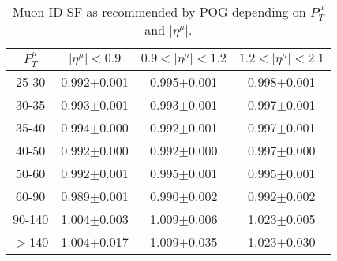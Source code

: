 \begin{table}[h]
  \footnotesize
  \begin{center}
  \caption{Muon ID SF as recommended by POG depending on $P_T^{\mu}$ and $|\eta^{\mu}|$.} 
   \begin{tabular}{|c|c|c|c|}
\hline
 $P_T^{\mu}$  & $|\eta^{\mu}|< 0.9$   & $0.9<|\eta^{\mu}|< 1.2$    & $1.2<|\eta^{\mu}|< 2.1$ \\ \hline
25-30          & 0.992$\pm$0.001   & 0.995$\pm$0.001    & 0.998$\pm$0.001     \\ \hline
30-35          & 0.993$\pm$0.001   & 0.993$\pm$0.001    & 0.997$\pm$0.001        \\ \hline
35-40          & 0.994$\pm$0.000   & 0.992$\pm$0.001    & 0.997$\pm$0.001        \\ \hline
40-50          & 0.992$\pm$0.000   & 0.992$\pm$0.000    & 0.997$\pm$0.000        \\ \hline
50-60          & 0.992$\pm$0.001   & 0.995$\pm$0.001    & 0.995$\pm$0.001        \\ \hline
60-90          & 0.989$\pm$0.001   & 0.990$\pm$0.002    & 0.992$\pm$0.002        \\ \hline
90-140         & 1.004$\pm$0.003   & 1.009$\pm$0.006    & 1.023$\pm$0.005        \\ \hline
$>$140         & 1.004$\pm$0.017   & 1.009$\pm$0.035    & 1.023$\pm$0.030        \\ \hline
  \end{tabular}
  \label{tab:SFs_MuonID}
  \end{center}
\end{table}

